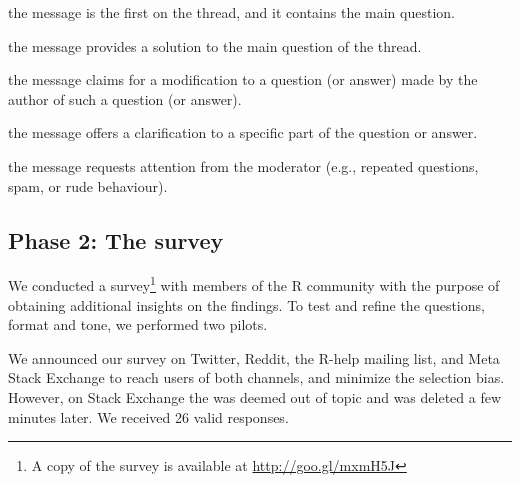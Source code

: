 	\begin{description}[itemsep=3pt, topsep=2pt, leftmargin=1em, parsep=0pt]
		\item[Question:] the message is the first on the thread, and it contains the main question.
		\item[Answer:] the message provides a solution to the main question of the thread.
	 	\item[Update:] the message claims for a modification to a question (or answer) made by the author of such a question (or answer).
		\item[Comment:] the message offers a clarification to a specific part of the question or answer.
		\item[Flag:] the message requests attention from the moderator (e.g., repeated questions, spam, or rude behaviour).
	\end{description}


\subsection{Phase 2: The survey} 


    We conducted a survey\footnote{A copy of the survey is available at \url{http://goo.gl/mxmH5J}} with members of the R community with the purpose of obtaining additional insights on the findings.
    To test and refine the questions, format and tone, we performed two pilots.
    
    We announced our survey on Twitter, Reddit, the R-help mailing list, and Meta Stack Exchange to reach users of both channels, and minimize the selection bias.
    However, on Stack Exchange the was deemed out of topic and was deleted a few minutes later. We received 26 valid responses.

